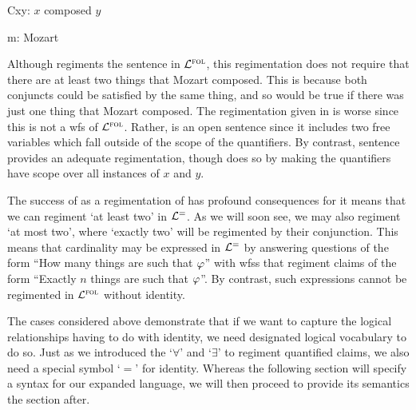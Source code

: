\begin{earg} \label{mo}
\end{earg}

\begin{multicols}{2}

  \begin{ekey}
    \item[Cxy:] $x$ composed $y$
    \item[m:] Mozart
  \end{ekey}

  \begin{earg} \label{mozart}
  \end{earg}

\end{multicols}

Although  regiments the sentence  in $\mathcal{L}^{\textsc{fol}}$, this regimentation does not require that there are at least two things that Mozart composed.
This is because both conjuncts could be satisfied by the same thing, and so  would be true if there was just one thing that Mozart composed.
The regimentation given in  is worse since this is not a wfs of $\mathcal{L}^{\textsc{fol}}$. 
Rather,  is an open sentence since it includes two free variables which fall outside of the scope of the quantifiers.
By contrast, sentence  provides an adequate regimentation, though does so by making the quantifiers have scope over all instances of $x$ and $y$. 

The success of  as a regimentation of  has profound consequences for it means that we can regiment `at least two' in $\mathcal{L}^{=}$.
As we will soon see, we may also regiment `at most two', where `exactly two' will be regimented by their conjunction.
This means that cardinality may be expressed in $\mathcal{L}^{=}$ by answering questions of the form ``How many things are such that $\varphi$'' with wfss that regiment claims of the form ``Exactly $n$ things are such that $\varphi$''.
By contrast, such expressions cannot be regimented in $\mathcal{L}^{\textsc{fol}}$ without identity.

The cases considered above demonstrate that if we want to capture the logical relationships having to do with identity, we need designated logical vocabulary to do so.
Just as we introduced the `$\forall$' and `$\exists$' to regiment quantified claims, we also need a special symbol `$=$' for identity.
Whereas the following section will specify a syntax for our expanded language, we will then proceed to provide its semantics the section after.




